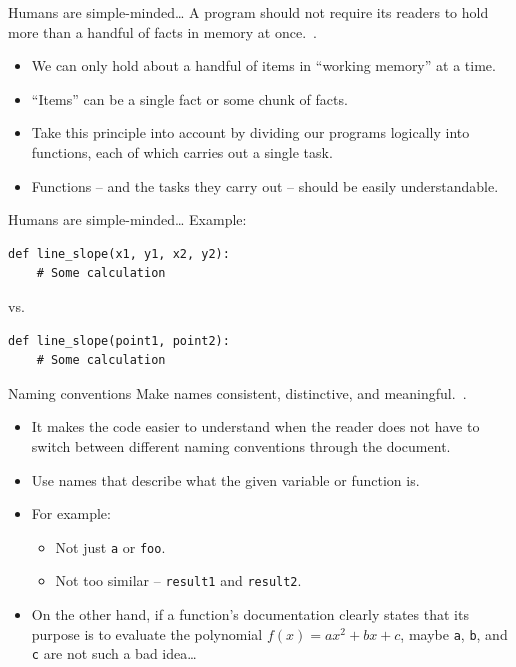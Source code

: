 \documentclass[english]{beamer}
\begin{document}
\begin{frame}{\insertsection}{Humans are simple-minded\ldots}
  A program should not require its readers to hold more than a handful
  of facts in memory at once.~\cite{Wilson2013}.
  \begin{itemize}
  \item We can only hold about a handful of items in ``working
    memory'' at a time.
  \item ``Items'' can be a single fact or some chunk of facts.
  \item Take this principle into account by dividing our programs
    logically into functions, each of which carries out a single task.
  \item Functions -- and the tasks they carry out -- should be easily
    understandable.
  \end{itemize}
\end{frame}


\begin{frame}[fragile]{\insertsection}{Humans are simple-minded\ldots}
  Example:
  \begin{lstlisting}
def line_slope(x1, y1, x2, y2):
    # Some calculation
  \end{lstlisting}
  vs.
  \begin{lstlisting}
def line_slope(point1, point2):
    # Some calculation
  \end{lstlisting}
\end{frame}


\begin{frame}{\insertsection}{Naming conventions}
  Make names consistent, distinctive, and
  meaningful.~\cite{Wilson2013}.
  \begin{itemize}
  \item It makes the code easier to understand when the reader does
    not have to switch between different naming conventions through
    the document.
  \item Use names that describe what the given variable or function
    is.
  \item For example:
    \begin{itemize}
    \item Not just \texttt{a} or \texttt{foo}.
    \item Not too similar -- \texttt{result1} and \texttt{result2}.
    \end{itemize}
  \item On the other hand, if a function's documentation clearly
    states that its purpose is to evaluate the polynomial $f(x) = ax^2
    + bx + c$, maybe \texttt{a}, \texttt{b}, and \texttt{c} are not
    such a bad idea\ldots
  \end{itemize}
\end{frame}
\end{document}
